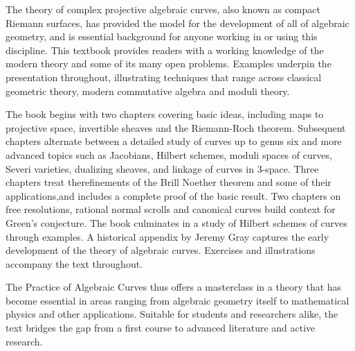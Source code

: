 The theory of complex projective algebraic curves, also known as compact Riemann surfaces, has provided the model for the development of all of algebraic geometry, and is essential background for anyone working in or using this discipline. This textbook provides readers with a working knowledge of the modern theory and some of its many open problems. Examples underpin the presentation throughout, illustrating techniques that range across classical geometric theory, modern commutative algebra and moduli theory.
 
The book begins with two chapters covering  basic ideas, including maps to projective space, invertible sheaves and the Riemann-Roch theorem. Subsequent chapters alternate between a detailed study of curves up to genus six and more advanced topics such as Jacobians, Hilbert schemes, moduli spaces of curves, Severi varieties, dualizing sheaves, and linkage of curves in 3-space. Three chapters treat the​ refinements of the Brill Noether theorem and some of ​t​heir applications,  ​a​nd includes a complete proof of the ​b​asic result. Two chapters on free resolutions, rational normal scrolls and canonical curves build context for Green’s conjecture. The book culminates in a study of Hilbert schemes​ of curves through examples. A historical appendix by Jeremy Gray captures the early development of the theory of algebraic curves. Exercises and illustrations accompany the text throughout.

The Practice of Algebraic Curves thus offers a masterclass in a theory that has become essential in  areas ranging from algebraic geometry itself to mathematical physics and other applications. Suitable for students and researchers alike, the text bridges the gap from a first course to advanced literature and active research.

